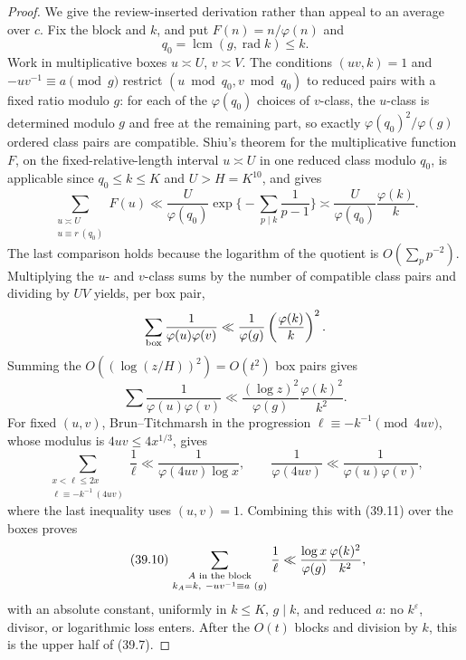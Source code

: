 \documentclass[10pt,reqno]{amsart}
\theoremstyle{definition}
\newcommand{\rad}{\operatorname {rad}}
\newcommand{\lcm}{\operatorname {lcm}}
\newcommand{\1}{\mathbf 1}
\begin{document}
\begin{proof}
We give the review-inserted derivation rather than appeal to an average over
$c$.  Fix the block and $k$, and put $F(n)=n/\varphi(n)$ and
\[
 q_0=\lcm(g,\rad k)\leq k.
\]
Work in multiplicative boxes $u\asymp U$, $v\asymp V$.  The conditions
$(uv,k)=1$ and $-uv^{-1}\equiv a\pmod g$ restrict
$(u\bmod q_0,v\bmod q_0)$ to reduced pairs with a fixed ratio modulo $g$:
for each of the $\varphi(q_0)$ choices of $v$-class, the $u$-class is
determined modulo $g$ and free at the remaining part, so exactly
$\varphi(q_0)^2/\varphi(g)$ ordered class pairs are compatible.  Shiu's
theorem for the multiplicative function $F$, on the fixed-relative-length
interval $u\asymp U$ in one reduced class modulo $q_0$, is applicable since
$q_0\leq k\leq K$ and $U>H=K^{10}$, and gives
\[
 \sum_{\substack{u\asymp U\\u\equiv r\ (q_0)}}F(u)
 \ll \frac{U}{\varphi(q_0)}
 \exp\Big\{-\sum_{p\mid k}\frac1{p-1}\Big\}
 \asymp \frac{U}{\varphi(q_0)}\frac{\varphi(k)}k.
\]
The last comparison holds because the logarithm of the quotient is
$O(\sum_p p^{-2})$.  Multiplying the $u$- and $v$-class sums by the number
of compatible class pairs and dividing by $UV$ yields, per box pair,
\[
 \sum_{\rm box}\frac1{\varphi(u)\varphi(v)}
 \ll\frac1{\varphi(g)}\left(\frac{\varphi(k)}k\right)^2.
\]
Summing the $O((\log(z/H))^2)=O(t^2)$ box pairs gives
\begin{equation}\tag{39.11}
 \sum\frac1{\varphi(u)\varphi(v)}
 \ll\frac{(\log z)^2}{\varphi(g)}\frac{\varphi(k)^2}{k^2}.
\end{equation}
For fixed $(u,v)$, Brun--Titchmarsh in the progression
$\ell\equiv-k^{-1}\pmod{4uv}$, whose modulus is
$4uv\leq4x^{1/3}$, gives
\[
 \sum_{\substack{x<\ell\leq2x\\
                  \ell\equiv-k^{-1}\ (4uv)}}\frac1\ell
 \ll\frac1{\varphi(4uv)\log x},
 \qquad
 \frac1{\varphi(4uv)}\ll\frac1{\varphi(u)\varphi(v)},
\]
where the last inequality uses $(u,v)=1$.  Combining this with (39.11)
over the boxes proves
\begin{equation}\tag{39.10}
 \sum_{\substack{A\text{ in the block}\atop
       k_A=k,\ -uv^{-1}\equiv a\ (g)}}\frac1\ell
 \ll\frac{\log x}{\varphi(g)}\frac{\varphi(k)^2}{k^2},
\end{equation}
with an absolute constant, uniformly in $k\leq K$, $g\mid k$, and reduced
$a$: no $k^\varepsilon$, divisor, or logarithmic loss enters.  After the
$O(t)$ blocks and division by $k$, this is the upper half of (39.7).


\end{proof}
\end{document}
